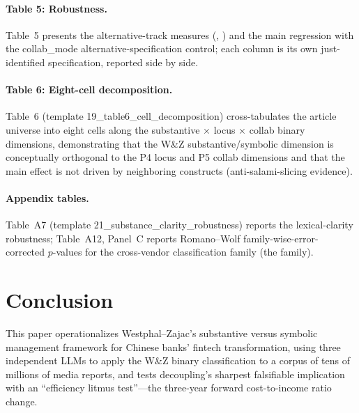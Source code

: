 \paragraph{Table 5: Robustness.}
Table~5 presents the alternative-track measures (,
) and the main regression with the collab\_mode
alternative-specification control; each column is its own just-identified
specification, reported side by side.

\paragraph{Table 6: Eight-cell decomposition.}
Table~6 (template 19\_table6\_cell\_decomposition) cross-tabulates the
article universe into eight cells along the substantive $\times$ locus
$\times$ collab binary dimensions, demonstrating that the W\&Z
substantive/symbolic dimension is conceptually orthogonal to the P4 locus
and P5 collab dimensions and that the main effect is not driven by
neighboring constructs (anti-salami-slicing evidence).

\paragraph{Appendix tables.}
Table~A7 (template 21\_substance\_clarity\_robustness) reports the
lexical-clarity robustness; Table~A12, Panel~C reports Romano--Wolf
family-wise-error-corrected $p$-values for the cross-vendor classification
family (the  family).

\section{Conclusion}\label{sec:conclusion}

This paper operationalizes Westphal--Zajac's substantive versus symbolic
management framework for Chinese banks' fintech transformation, using three
independent LLMs to apply the W\&Z binary classification to a corpus of tens
of millions of media reports, and tests decoupling's sharpest falsifiable
implication with an ``efficiency litmus test''---the three-year forward
cost-to-income ratio change.

